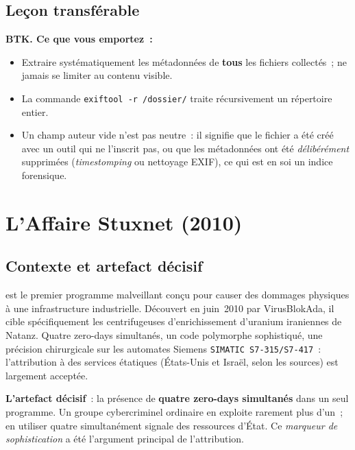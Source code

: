 \subsection{Leçon transférable}

\begin{boxresume}
\textbf{BTK. Ce que vous emportez~:}
\begin{itemize}
    \item Extraire systématiquement les métadonnées de \textbf{tous} les
          fichiers collectés~; ne jamais se limiter au contenu visible.
    \item La commande \lstinline[language=bash_forensique]{exiftool -r /dossier/}
          traite récursivement un répertoire entier.
    \item Un champ auteur vide n'est pas neutre~: il signifie que le fichier
          a été créé avec un outil qui ne l'inscrit pas, ou que les
          métadonnées ont été \emph{délibérément} supprimées (\textit{timestomping}
          ou nettoyage EXIF), ce qui est en soi un indice forensique.
\end{itemize}
\end{boxresume}

\section{L'Affaire Stuxnet (2010)}
\label{sec:stuxnet}

\subsection{Contexte et artefact décisif}

 est le premier programme malveillant conçu pour causer des
dommages physiques à une infrastructure industrielle. Découvert en juin~2010
par VirusBlokAda, il cible spécifiquement les centrifugeuses d'enrichissement
d'uranium iraniennes de Natanz. Quatre zero-days simultanés, un code polymorphe
sophistiqué, une précision chirurgicale sur les automates Siemens
\texttt{SIMATIC S7-315/S7-417}~: l'attribution à des services étatiques
(États-Unis et Israël, selon les sources) est largement acceptée.

\medskip

\textbf{L'artefact décisif}~: la présence de \textbf{quatre zero-days
simultanés} dans un seul programme. Un groupe cybercriminel ordinaire
en exploite rarement plus d'un~; en utiliser quatre simultanément signale
des ressources d'État. Ce \textit{marqueur de sophistication} a été
l'argument principal de l'attribution.

